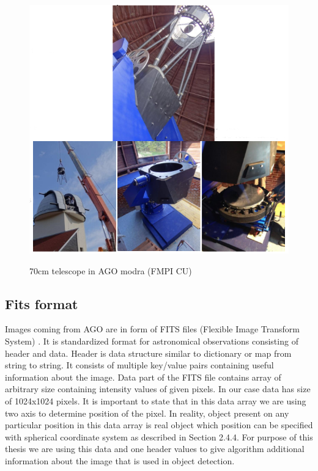 \documentclass[12pt, a4paper, oneside]{book}
\begin{document}
\begin{figure}[!h]
    \begin{center}
        \includegraphics[scale=0.35]{images/telescope.png}
        \label{img:telescope}
        \caption{70cm telescope in AGO modra (FMPI CU)}
    \end{center}
\end{figure}

\subsection{Fits format}
Images coming from AGO are in form of FITS files (Flexible Image Transform System) \cite{fits}.
It is standardized format for astronomical observations consisting of header and data.
Header is data structure similar to dictionary or map from string to string.
It consists of multiple key/value pairs containing useful information about the image.
Data part of the FITS file contains array of arbitrary size containing intensity values of given pixels.
In our case data has size of 1024x1024 pixels.
It is important to state that in this data array we are using two axis to determine position of the pixel.
In reality, object present on any particular position in this data array is real object which position can be specified with spherical coordinate system as described in Section 2.4.4.
For purpose of this thesis we are using this data and one header values to give algorithm additional information about the image that is used in object detection.
\end{document}
